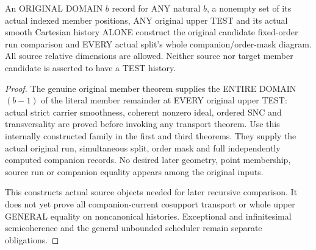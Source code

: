 \begin{theorem}
\label{hir:original-member-untested-order-companion-smooth-history}
\leanok
An ORIGINAL DOMAIN $b$ record for ANY natural $b$, a nonempty set of
its actual indexed member positions, ANY original upper TEST and its
actual smooth Cartesian history ALONE construct the original
candidate fixed-order run comparison and EVERY actual split's
whole companion/order-mask diagram. All source relative dimensions
are allowed. Neither source nor target member candidate is asserted
to have a TEST history.
\end{theorem}
\begin{proof}
The genuine original member theorem supplies the ENTIRE DOMAIN
$(b-1)$ of the literal member remainder at EVERY original upper TEST:
actual strict carrier smoothness, coherent nonzero ideal, ordered SNC
and transversality are proved before invoking any transport theorem.
Use this internally constructed family in the first and third
theorems. They supply the actual original run, simultaneous split,
order mask and full independently computed companion records. No
desired later geometry, point membership, source run or companion
equality appears among the original inputs.

This constructs actual source objects needed for later recursive
comparison. It does not yet prove all companion-current cosupport
transport or whole upper GENERAL equality on noncanonical histories.
Exceptional and infinitesimal semicoherence and the general unbounded
scheduler remain separate obligations.
\end{proof}
